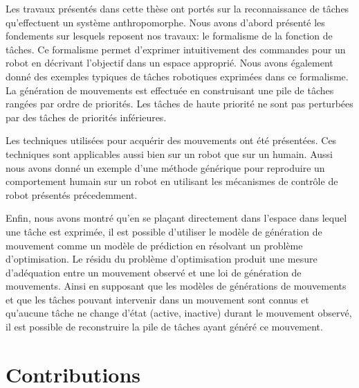Les travaux présentés dans cette thèse ont portés
sur la reconnaissance de tâches qu'effectuent un système anthropomorphe.
Nous avons d'abord présenté les fondements sur lesquels reposent nos
travaux: le formalisme de la fonction de t\^aches.
Ce formalisme permet d'exprimer intuitivement des commandes pour un 
robot en décrivant l'objectif dans un espace approprié. Nous avons également donné
des exemples typiques de t\^aches robotiques exprimées
dans ce formalisme. La génération de mouvements est effectuée en construisant une pile
de t\^aches rangées par ordre de priorités.
Les t\^aches 
de haute priorité ne sont pas perturbées par
des t\^aches de priorités inférieures.

Les techniques utilisées pour acquérir des mouvements ont été présentées.
Ces techniques sont applicables aussi bien sur un robot que sur un humain.
Aussi nous avons donné un exemple d'une méthode générique pour reproduire 
un comportement humain sur un robot en utilisant les mécanismes de contrôle
de robot présentés précedemment.

Enfin, nous avons montré qu'en se plaçant directement dans l'espace dans lequel 
une tâche est exprimée, il est possible d'utiliser le modèle
de génération de mouvement comme un modèle de prédiction en résolvant
un problème d'optimisation. Le résidu du problème d'optimisation
produit une mesure d'adéquation entre un mouvement observé et
une loi de génération de mouvements. Ainsi
en supposant que les modèles de générations de mouvements et que les tâches
pouvant intervenir dans un mouvement sont connus et 
qu'aucune tâche ne change d'état (active, inactive) durant le mouvement observé, il est possible 
de reconstruire la pile de t\^aches ayant généré ce mouvement.


\section*{Contributions}
